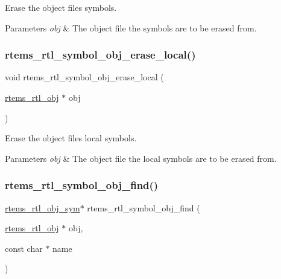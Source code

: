 Erase the object file\textquotesingle{}s symbols.


\begin{DoxyParams}{Parameters}
{\em obj} & The object file the symbols are to be erased from. \\
\hline
\end{DoxyParams}
\mbox{\label{rtl-sym_8h_a02b3a4ba7169bb4f243a5be15b301391}} 
\subsubsection{\texorpdfstring{rtems\_rtl\_symbol\_obj\_erase\_local()}{rtems\_rtl\_symbol\_obj\_erase\_local()}}
{\footnotesize\ttfamily void rtems\+\_\+rtl\+\_\+symbol\+\_\+obj\+\_\+erase\+\_\+local (\begin{DoxyParamCaption}\item[{\mbox{\hyperlink{structrtems__rtl__obj}{rtems\+\_\+rtl\+\_\+obj}} $\ast$}]{obj }\end{DoxyParamCaption})}

Erase the object file\textquotesingle{}s local symbols.


\begin{DoxyParams}{Parameters}
{\em obj} & The object file the local symbols are to be erased from. \\
\hline
\end{DoxyParams}
\mbox{\label{rtl-sym_8h_a98e04c5083c6560c69802ee44b839459}} 
\subsubsection{\texorpdfstring{rtems\_rtl\_symbol\_obj\_find()}{rtems\_rtl\_symbol\_obj\_find()}}
{\footnotesize\ttfamily \mbox{\hyperlink{structrtems__rtl__obj__sym}{rtems\+\_\+rtl\+\_\+obj\+\_\+sym}}$\ast$ rtems\+\_\+rtl\+\_\+symbol\+\_\+obj\+\_\+find (\begin{DoxyParamCaption}\item[{\mbox{\hyperlink{structrtems__rtl__obj}{rtems\+\_\+rtl\+\_\+obj}} $\ast$}]{obj,  }\item[{const char $\ast$}]{name }\end{DoxyParamCaption})}


